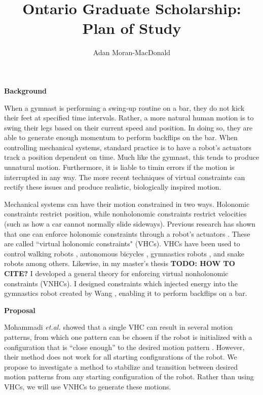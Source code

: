 \documentclass[a4paper,12pt]{article}
\begin{document}
\title{Ontario Graduate Scholarship: Plan of Study}
\author{Adan Moran-MacDonald}
\date{}
\maketitle

\begin{large}
\textbf{Background}
\end{large}

When a gymnast is performing a swing-up routine on a bar, they do not kick their
feet at specified time intervals. Rather, a more natural human motion is to
swing their legs based on their current speed and position. In doing so, they
are able to generate enough momentum to perform backflips on the bar. When
controlling mechanical systems, standard practice is to have a robot's actuators
track a position dependent on time. Much like the gymnast, this tends to
produce unnatural motion. Furthermore, it is liable to timin errors if the
motion is interrupted in any way. The more recent techniques of virtual constraints 
can rectify these issues and produce realistic, biologically inspired motion.

Mechanical systems can have their motion constrained in two ways. Holonomic 
constraints restrict position, while nonholonomic constraints restrict
velocities (such as how a car cannot normally slide sideways). Previous research
has shown that one can enforce holonomic constraints through a robot's
actuators \cite{vhcs_for_el_systems}. These are called ``virtual holonomic
constraints" (VHCs). VHCs have been used to control walking robots \cite{stable-walking},
autonomous bicycles \cite{bicycle}, gymnastics robots \cite{xingbo-thesis}, and
snake robots \cite{snake-robot} among others. Likewise, in my 
master's thesis \textbf{TODO: HOW TO CITE?} I developed a general theory for
enforcing virtual nonholonomic constraints (VNHCs). I designed constraints which
injected energy into the gymnastics robot created by 
Wang \cite{xingbo-thesis}, enabling it to perform backflips on a bar.

\begin{large} \textbf{Proposal} \end{large}

Mohammadi \textit{et.al.} showed that a single VHC can result in several motion
patterns, from which one pattern can be chosen if the robot is initialized with
a configuration that is ``close enough” to the desired motion pattern
\cite{manfredi-orbit-stabilization}. However, their method does not work for all
starting configurations of the robot. We propose to investigate a method to
stabilize and transition between desired motion patterns from any starting
configuration of the robot. Rather than using VHCs, we will use VNHCs to
generate these motions.
\end{document}
